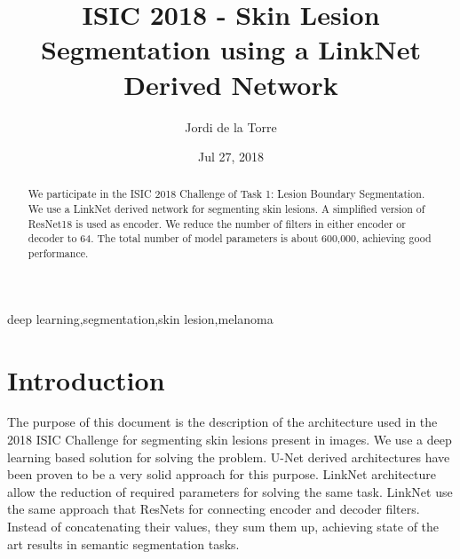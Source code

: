 \documentclass[preprint]{elsarticle}
\theoremstyle{definition} %
\theoremstyle{remark}
\begin{document}
\begin{frontmatter}

\title{ISIC 2018 - Skin Lesion Segmentation using a LinkNet Derived Network}

\author[rvt]{Jordi de la Torre}



\address[rvt]{Departament d'Enginyeria Inform\`atica i Matem\`atiques.\\Escola T\`ecnica Superior d'Enginyeria.\\Universitat Rovira i Virgili\\Avinguda Paisos Catalans, 26. E-43007\\
Tarragona, Spain}

\date{Jul 27, 2018}

\begin{abstract}
We participate in the ISIC 2018 Challenge of Task 1: Lesion Boundary Segmentation. We use a LinkNet derived network for segmenting skin lesions. A simplified version of ResNet18 is used as encoder. We reduce the number of filters in either encoder or decoder to 64. The total number of model parameters is about 600,000, achieving good performance.
\end{abstract}

\begin{keyword}
deep learning\sep segmentation\sep skin lesion\sep melanoma
\end{keyword}

\end{frontmatter}


\section{Introduction}
The purpose of this document is the description of the architecture used in the 2018 ISIC Challenge for segmenting skin lesions present in images. We use a deep learning based solution for solving the problem. U-Net \cite{ronneberger2015u} derived architectures have been proven to be a very solid approach for this purpose. LinkNet \cite{DBLP:journals/corr/ChaurasiaC17} architecture allow the reduction of required parameters for solving the same task. LinkNet use the same approach that ResNets \cite{he2016deep} for connecting encoder and decoder filters. Instead of concatenating their values, they sum them up, achieving state of the art results in semantic segmentation tasks. 
\end{document}
